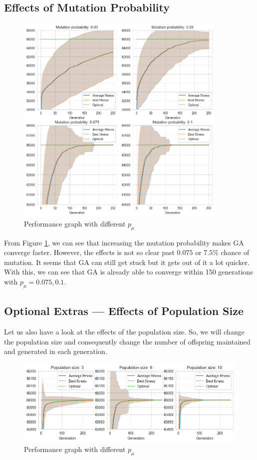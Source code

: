 \subsection{Effects of Mutation Probability}

\begin{figure}[ht]
    \centering
    \includegraphics[width=0.9\textwidth]{../images/p2/part5.png}
    \caption{Performance graph with different \(p_\mu\)}
    \label{fig:p4-5}
\end{figure}

From Figure \ref{fig:p4-5}, we can see that increasing the mutation probability makes GA converge faster. However, the effects is not so clear past \(0.075\) or \(7.5\%\) chance of mutation. It seems that GA can still get stuck but it gets out of it a lot quicker. With this, we can see that GA is already able to converge within 150 generations with \(p_\mu = 0.075, 0.1\).

\subsection{Optional Extras --- Effects of Population Size}

Let us also have a look at the effects of the population size. So, we will change the population size and consequently change the number of offspring maintained and generated in each generation.

\begin{figure}[ht]
    \centering
    \includegraphics[width=\textwidth]{../images/p2/part6.png}
    \caption{Performance graph with different \(p_\mu\)}
    \label{fig:p4-6}
\end{figure}

